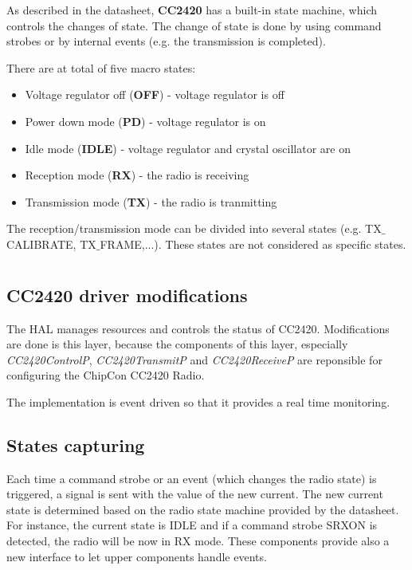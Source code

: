 \documentclass[a4paper,11pt]{article}
\begin{document}
As described in the datasheet, \textbf{CC2420} has a built-in state machine, which controls the changes of state. The change of state is done by using command strobes or by internal events (e.g. the transmission is completed).

There are at total of five macro states:
  \begin{itemize}
    \item Voltage regulator off (\textbf{OFF}) - voltage regulator is off
    \item Power down mode (\textbf{PD}) - voltage regulator is on
    \item Idle mode (\textbf{IDLE}) - voltage regulator and crystal oscillator are on
    \item Reception mode (\textbf{RX}) - the radio is receiving
    \item Transmission mode (\textbf{TX}) - the radio is tranmitting
  \end{itemize}

The reception/transmission mode can be divided into several states (e.g. TX$\_$CALIBRATE, TX$\_$FRAME,...). These states are not considered as specific states.


\section{}

  \subsection{CC2420 driver modifications}


The HAL manages resources and controls the status of CC2420. Modifications are done is this layer, because the components of this layer, especially \emph{CC2420ControlP}, \emph{CC2420TransmitP} and \emph{CC2420ReceiveP} are reponsible for configuring the ChipCon CC2420 Radio.

The implementation is event driven so that it provides a real time monitoring.

  \subsection{States capturing}


Each time a command strobe or an event (which changes the radio state) is triggered, a signal is sent with the value of the new current. The new current state is determined based on the radio state machine provided by the datasheet. For instance, the current state is IDLE and if a command strobe SRXON is detected, the radio will be now in RX mode.
These components provide also a new interface to let upper components handle events.
\end{document}
